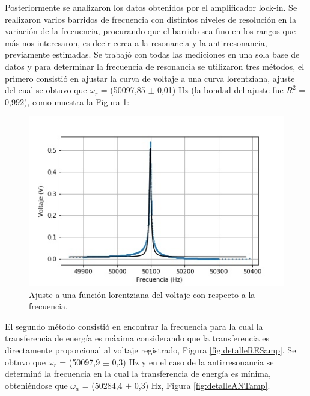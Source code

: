 \documentclass[twoside,twocolumn,a4paper]{article}
\begin{document}
\par
Posteriormente se analizaron los datos obtenidos por el amplificador lock-in. Se realizaron varios barridos de frecuencia con distintos niveles de resoluci\'on en la variaci\'on de la frecuencia, procurando que el barrido sea fino en los rangos que m\'as nos interesaron, es decir cerca a la resonancia y la antirresonancia, previamente estimadas. Se trabaj\'o con todas las mediciones en una sola base de datos y para determinar la frecuencia de resonancia se utilizaron tres m\'etodos, el primero consisti\'o en ajustar la curva de voltaje a una curva lorentziana, ajuste del cual se obtuvo que $\omega_{r}$ = (50097,85 $\pm$ 0,01) Hz (la bondad del ajuste fue $R^{2}$ = 0,992), como muestra la Figura \ref{fig:ajuste}:


\begin{figure}[H]
\includegraphics[width=\linewidth]{ajuste.jpg}
\caption{Ajuste a una funci\'on lorentziana del voltaje con respecto a la frecuencia.}
\label{fig:ajuste}
\end{figure}


El segundo m\'etodo consisti\'o en encontrar la frecuencia para la cual la transferencia de energ\'ia es m\'axima considerando que la transferencia es directamente proporcional al voltaje registrado,  Figura \ref{fig:detalleRESamp}. Se obtuvo que $\omega_{r}$ = (50097,9 $\pm$ 0,3) Hz y en el caso de la antirresonancia se determin\'o la frecuencia en la cual la transferencia de energ\'ia es m\'inima, obteni\'endose que $\omega_{a}$ = (50284,4 $\pm$ 0,3) Hz, Figura \ref{fig:detalleANTamp}.
\end{document}
